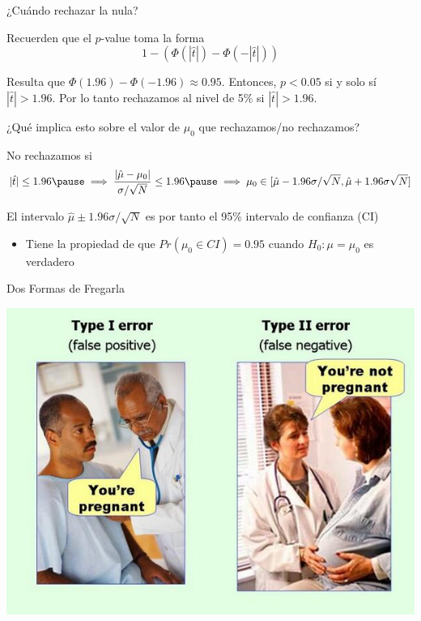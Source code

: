 \documentclass[11pt,handout,aspectratio=169]{beamer}
\newenvironment{wideitemize}{\itemize\addtolength{\itemsep}{10pt}}{\enditemize}
\begin{document}
\begin{frame}{¿Cuándo rechazar la nula?}

\begin{wideitemize}
	\item 
	Recuerden que el $p$-value toma la forma
	$$1 - \left(  \Phi(|\hat{t}|) - \Phi( -|\hat{t}| )  \right) $$
	
	\item
	Resulta que $\Phi(1.96) - \Phi(-1.96) \approx 0.95$. Entonces, $p < 0.05$ si y solo sí $|\hat{t}| > 1.96$. Por lo tanto rechazamos al nivel de  5\% si $|\hat{t}| > 1.96$. 
	
	\pause
	\item
	¿Qué implica esto sobre el valor de $\mu_0$ que rechazamos/no rechazamos?
	
	\pause
	\item
	No rechazamos si 	
	$$ |\hat{t}| \leq 1.96 \pause \implies \dfrac{ |\hat\mu - \mu_0| }{ \sigma / \sqrt{N} } \leq 1.96 \pause \implies \mu_0 \in  [\hat\mu - 1.96 \sigma / \sqrt{N} , \hat\mu + 1.96 \sigma \sqrt{N}]$$
\vspace{-0.5cm}
	\pause
	\item
	El intervalo $\hat\mu \pm 1.96 \sigma / \sqrt{N}$ es por tanto el 95\% intervalo de confianza (CI)
	\smallskip

		\begin{itemize}
			\item 
			Tiene la propiedad de que $Pr( \mu_0 \in CI ) = 0.95$ cuando $H_0: \mu = \mu_0$ es verdadero
		\end{itemize}
	
\end{wideitemize}
	
\end{frame}



\begin{frame}{Dos Formas de Fregarla}
	
	\begin{center}
	\includegraphics[scale=0.5]{type_errors.jpg}
	\end{center}

\end{frame}
\end{document}
